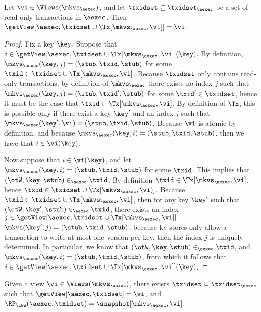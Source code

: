 \begin{proposition}
\label{prop:getview.tx}
Let \(\vi \in \Views(\mkvs_{\aexec})\), and let \(\txidset \subseteq \txidset_{\aexec}\) be a 
set of read-only transactions in \(\aexec\). Then 
\(\getView[\aexec, \txidset \cup \Tx[\mkvs_{\aexec}, \vi]] = \vi\). 
\end{proposition}

\begin{proof}
Fix a key \(\key\). Suppose that \(i \in \getView[\aexec, \txidset \cup \Tx[\mkvs_{\aexec}, \vi]](\key)\). 
By definition, \(\mkvs_{\aexec}(\key, j) = (\stub, \txid, \stub)\) for some \(\txid \in \txidset \cup \Tx[\mkvs_{\aexec}, \vi]\). 
Because \(\txidset\) only contains read-only transactions, by definition of \(\mkvs_{\aexec}\) there exists 
no index \(j\) such that \(\mkvs_{\aexec}(\key, j) = (\stub, \txid', \stub)\) for some \(\txid' \in \txidset\), 
hence it must be the case that \(\txid \in \Tx[\mkvs_{\aexec}, \vi]\). By definition of \(\Tx\), 
this is possible only if there exist a key \(\key'\) and an index \(j\) such that \(\mkvs_{\aexec}(\key', \vi) = (\stub, \txid, \stub)\). 
Because \(\vi\) is atomic by definition, and because \(\mkvs_{\aexec}(\key, i) = (\stub, \txid, \stub)\), then we have that \(i \in \vi(\key)\). 

Now suppose that \(i \in \vi(\key)\), and let \(\mkvs_{\aexec}(\key, i) = (\stub, \txid, \stub)\) for some \(\txid\). 
This implies that \((\otW, \key, \stub) \in_{\aexec} \txid\).
By definition \(\txid \in \Tx[\mkvs_{\aexec}, \vi]\), hence \(\txid \in \txidset \cup \Tx[\mkvs_{\aexec}, \vi)]\). 
Because \(\txid \in \txidset \cup \Tx[\mkvs_{\aexec}, \vi]\), then for any key \(\key'\) such that 
\((\otW, \key', \stub) \in_{\aexec} \txid\), there exists an index \(j \in \getView[\aexec, \txidset \cup \Tx[\mkvs_{\aexec}, \vi]]\) 
\(\mkvs(\key', j) = (\stub, \txid, \stub)\); because kv-stores only allow a transaction to write at most one version 
per key, then the index \(j\) is uniquely determined. In particular, we know that \((\otW, \key, \stub) \in_{\aexec} \txid\), 
and \(\mkvs_{\aexec}(\key, i) = (\stub, \txid, \stub)\), from which it follows that \(i \in \getView[\aexec, \txidset \cup \Tx[\mkvs_{\aexec}, \vi]](\key)\).
\end{proof}


\begin{proposition}
\label{prop:compatible.kv2aexec}
Given a view \(\vi \in \Views(\mkvs_{\aexec})\), there exists \(\txidset \subseteq \txidset_{\aexec}\) 
such that \(\getView[\aexec, \txidset] = \vi\), and \(\RP_{\LWW}(\aexec, \txidset) = \snapshot[\mkvs_{\aexec}, \vi]\).
\end{proposition}

